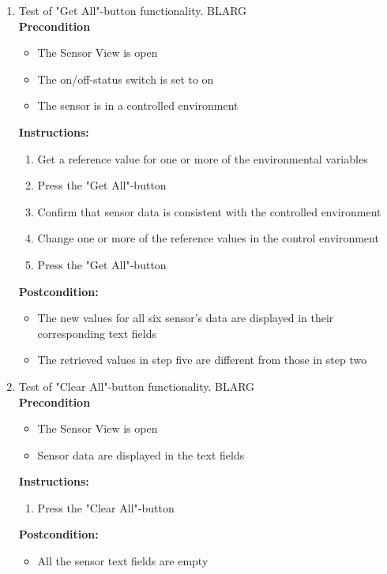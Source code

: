 \documentclass[a4paper]{article}
\newlength{\testlabellength}
\newenvironment{testlist}{\begin{enumerate}[label=\bfseries Instruction \thesubsection.\arabic* , labelindent=0pt, labelwidth=\testlabellength , leftmargin=2cm]}{\end{enumerate}}
\newenvironment{precondition}{
{\color{white}BLARG}\\ 
\textbf{Precondition}
\begin{itemize}[labelindent=0cm, labelwidth=2cm , leftmargin=1cm]
}
{\end{itemize}}
\newenvironment{instruction}{
\textbf{Instructions:}
\begin{enumerate}[label=\bfseries  \arabic*., labelindent=0cm, labelwidth=2cm , leftmargin=1cm]
}
{\end{enumerate}}
\newenvironment{postcondition}{
\textbf{Postcondition:}
\begin{itemize}[labelindent=0cm, labelwidth=2cm , leftmargin=1cm]
}
{\end{itemize}}
\begin{document}
\begin{appendices}
\begin{testlist}
	\item Test of "Get All"-button functionality.
		\begin{precondition}
			\item The Sensor View is open
			\item The on/off-status switch is set to on
			\item The sensor is in a controlled environment
		\end{precondition}
		\begin{instruction}
			\item Get a reference value for one or more of the environmental variables
			\item Press the "Get All"-button
			\item Confirm that sensor data is consistent with the controlled environment
			\item Change one or more of the reference values in the control environment
			\item Press the "Get All"-button
		\end{instruction}
		\begin{postcondition}
			\item The new values for all six sensor's data are displayed in their corresponding text fields
			\item The retrieved values in step five are different from those in step two
		\end{postcondition}

\newpage

	\item Test of "Clear All"-button functionality.
		\begin{precondition}
			\item The Sensor View is open
			\item Sensor data are displayed in the text fields
		\end{precondition}
		\begin{instruction}
			\item Press the "Clear All"-button
		\end{instruction}
		\begin{postcondition}
			\item All the sensor text fields are empty
		\end{postcondition}


\end{testlist}
\end{appendices}
\end{document}
